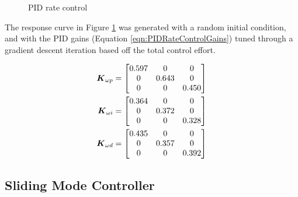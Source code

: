 \begin{figure}[H]
  \centerline{}
  \caption{PID rate control}
  \label{fig:PIDRateControl}
\end{figure}

The response curve in Figure \ref{fig:PIDRateControl} was generated with a random initial condition, and with the PID gains (Equation \ref{eqn:PIDRateControlGains}) tuned through a gradient descent iteration based off the total control effort.

\begin{subequations}
  \begin{align}
    \boldsymbol{K}_{\omega p} &= \begin{bmatrix} 0.597 & 0 & 0 \\ 0 & 0.643 & 0 \\ 0 & 0 & 0.450 \end{bmatrix} \\
    \boldsymbol{K}_{\omega i} &= \begin{bmatrix} 0.364 & 0 & 0 \\ 0 & 0.372 & 0 \\ 0 & 0 & 0.328 \end{bmatrix} \\
    \boldsymbol{K}_{\omega d} &= \begin{bmatrix} 0.435 & 0 & 0 \\ 0 & 0.357 & 0 \\ 0 & 0 & 0.392 \end{bmatrix}
  \end{align}
  \label{eqn:PIDRateControlGains}
\end{subequations}

\subsection{Sliding Mode Controller}
\label{subsec:SlidingModeController}

